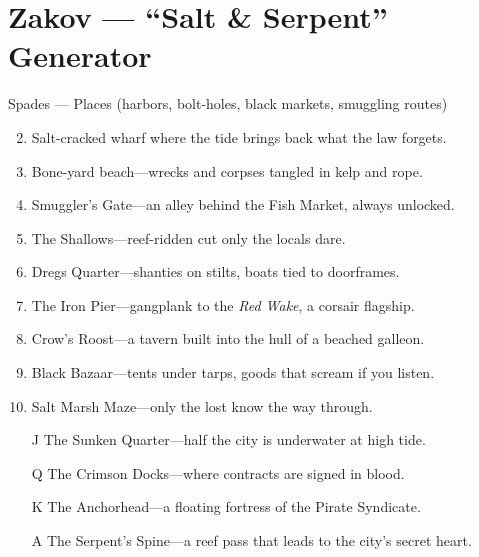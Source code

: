 \chapter{Zakov --- ``Salt \& Serpent'' Generator}

Spades --- Places (harbors, bolt-holes, black markets, smuggling routes)
\begin{enumerate}
\setcounter{enumi}{1}
\item Salt-cracked wharf where the tide brings back what the law forgets.
\item Bone-yard beach---wrecks and corpses tangled in kelp and rope.
\item Smuggler's Gate---an alley behind the Fish Market, always unlocked.
\item The Shallows---reef-ridden cut only the locals dare.
\item Dregs Quarter---shanties on stilts, boats tied to doorframes.
\item The Iron Pier---gangplank to the \textit{Red Wake}, a corsair flagship.
\item Crow's Roost---a tavern built into the hull of a beached galleon.
\item Black Bazaar---tents under tarps, goods that scream if you listen.
\item Salt Marsh Maze---only the lost know the way through.
\item[J] The Sunken Quarter---half the city is underwater at high tide.
\item[Q] The Crimson Docks---where contracts are signed in blood.
\item[K] The Anchorhead---a floating fortress of the Pirate Syndicate.
\item[A] The Serpent's Spine---a reef pass that leads to the city's secret heart.
\end{enumerate}

